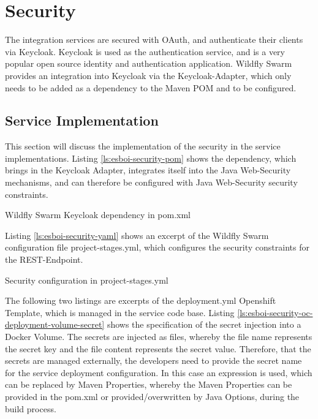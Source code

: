 \section{Security}
\label{sec:esbi-security}
The integration services are secured with OAuth, and authenticate their clients via Keycloak. Keycloak is used as the authentication service, and is a very popular open source identity and authentication application. Wildfly Swarm provides an integration into Keycloak via the Keycloak-Adapter, which only needs to be added as a dependency to the Maven POM and to be configured.

\subsection{Service Implementation}
\label{sec:esbi-security-service}
This section will discuss the implementation of the security in the service implementations. Listing \vref{ls:esboi-security-pom} shows the dependency, which brings in the Keycloak Adapter, integrates itself into the Java Web-Security mechanisms, and can therefore be configured with Java Web-Security security constraints.
\begin{listing}
	\caption{Wildfly Swarm Keycloak dependency in pom.xml}
	\label{ls:esboi-security-pom}
\end{listing}

Listing \vref{ls:esboi-security-yaml} shows an excerpt of the Wildfly Swarm configuration file project-stages.yml, which configures the security constraints for the REST-Endpoint.

\begin{listing}
	\caption{Security configuration in project-stages.yml}
	\label{ls:esboi-security-yaml}
\end{listing}

The following two listings are excerpts of the deployment.yml Openshift Template, which is managed in the service code base. Listing \vref{ls:esboi-security-oc-deployment-volume-secret} shows the specification of the secret injection into a Docker Volume. The secrets are injected as files, whereby the file name represents the secret key and the file content represents the secret value. Therefore, that the secrets are managed externally, the developers need to provide the secret name for the service deployment configuration. In this case an expression is used, which can be replaced by Maven Properties, whereby the Maven Properties can be provided in the pom.xml or provided/overwritten by Java Options, during the build process.

